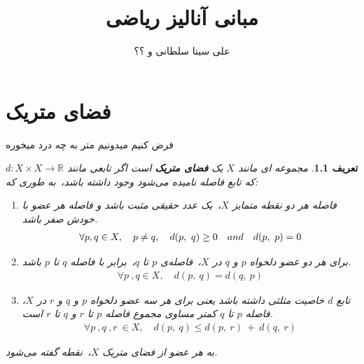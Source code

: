 \documentclass[12pt]{book}
\title{مبانی آنالیز ریاضی}
\author{علی سینا سلطانی و ؟؟}
\date{}
\newtheorem{df}[thm]{\textbf{تعریف}}
\begin{document}
	\chapter{فضای متریک}\label{CH1: Metric Space}
	فرض کنیم میدونیم متر به چه درد میخوره
	\begin{df}\label{Def1: Metric Space}
		مجموعه ای مانند \( X \) یک \textbf{فضای متریک} است اگر تابعی مانند \( d:X \times X \to \mathbb{R} \) که تابع فاصله نامیده می‌شود وجود داشته باشد،\, ‌به طوری که:
		\begin{enumerate}
			\item[الف)] 
			فاصله هر دو نقطه متمایز \( X \)،‌\, یک عدد حقیقی مثبت باشد و فاصله هر عضو با خودش صفر باشد.
			\begin{align}
				\forall p,q \in X,\quad p \centernot = q,\quad d(p,\ q) \geq 0 \quad and \quad d(p,\ p) = 0
			\end{align}
			\item[ب)]
			برای هر دو عضو دلخواه \( p \) و  \( q \) در  \( X \)،\, فاصله‌ی \( p \) تا \( q \)،‌\, برابر با فاصله \( q \) تا \( p \) باشد.
		\begin{align}
			\forall p\ ,q \in X, \quad d(p,\ q) = d(q,\ p)
		\end{align}
		\item[ج)]
		تابع  \( d \) خاصیت مثلثی داشته باشد یعنی برای هر سه عضو دلخواه \( p \) و \( q \) و \( r \) در \( X \)، فاصله \( p \) تا \( q \) کمتر مساوی مجموع فاصله \( p \) تا \( r \) و \( q \) تا \( r \) است.
		\begin{align}
			\forall p\ ,q\ ,r\ \in X, \quad d(p,\ q) \leq d(p,\ r)\ + \ d(q,\ r)
		\end{align}
		\end{enumerate}
	به هر عضو از فضای متریک  \( X \)،\, نقطه گفته می‌شود.
	\end{df}
	\pagebreak
\end{document}
